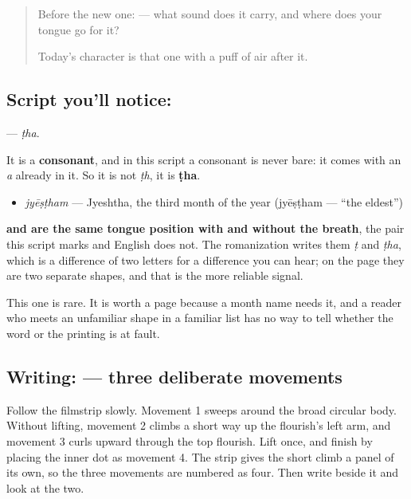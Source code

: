\label{lesson:TE-S155-letter-ttha}



\begin{quote}
Before the new one:  — what sound does it carry, and where does your tongue go for it?

Today's character is that one with a puff of air after it.
\end{quote}

\subsection*{Script you'll notice: }
\textbf{} — \emph{ṭha}.

It is a \textbf{consonant}, and in this script a consonant is never bare: it comes with an \emph{a} already in it. So it is not \emph{ṭh}, it is \textbf{ṭha}.

\begin{itemize}
\raggedright
  \item \textbf{} \emph{jyēṣṭham} — Jyeshtha, the third month of the year (jyēṣṭham — \textquotedblleft{}the eldest\textquotedblright{})
\end{itemize}

\textbf{ and  are the same tongue position with and without the breath}, the pair this script marks and English does not. The romanization writes them \emph{ṭ} and \emph{ṭha}, which is a difference of two letters for a difference you can hear; on the page they are two separate shapes, and that is the more reliable signal.

This one is rare. It is worth a page because a month name needs it, and a reader who meets an unfamiliar shape in a familiar list has no way to tell whether the word or the printing is at fault.

\subsection*{Writing:  — three deliberate movements}

Follow the filmstrip slowly. Movement 1 sweeps around the broad circular body. Without lifting, movement 2 climbs a short way up the flourish's left arm, and movement 3 curls upward through the top flourish. Lift once, and finish by placing the inner dot as movement 4. The strip gives the short climb a panel of its own, so the three movements are numbered as four. Then write  beside it and look at the two.

